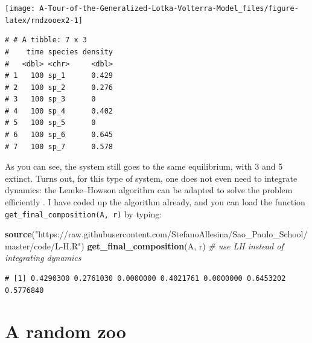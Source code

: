 \documentclass[]{book}
\newenvironment{Shaded}{\begin{snugshade}}{\end{snugshade}}
\newcommand{\CommentTok}[1]{\textcolor[rgb]{0.56,0.35,0.01}{\textit{#1}}}
\newcommand{\DataTypeTok}[1]{\textcolor[rgb]{0.13,0.29,0.53}{#1}}
\newcommand{\DecValTok}[1]{\textcolor[rgb]{0.00,0.00,0.81}{#1}}
\newcommand{\KeywordTok}[1]{\textcolor[rgb]{0.13,0.29,0.53}{\textbf{#1}}}
\newcommand{\NormalTok}[1]{#1}
\newcommand{\OperatorTok}[1]{\textcolor[rgb]{0.81,0.36,0.00}{\textbf{#1}}}
\newcommand{\StringTok}[1]{\textcolor[rgb]{0.31,0.60,0.02}{#1}}
\begin{document}
\begin{center}\texttt{[image: A-Tour-of-the-Generalized-Lotka-Volterra-Model\_files/figure-latex/rndzooex2-1]} \end{center}

\begin{Shaded}
\end{Shaded}

\begin{verbatim}
# # A tibble: 7 x 3
#    time species density
#   <dbl> <chr>     <dbl>
# 1   100 sp_1      0.429
# 2   100 sp_2      0.276
# 3   100 sp_3      0    
# 4   100 sp_4      0.402
# 5   100 sp_5      0    
# 6   100 sp_6      0.645
# 7   100 sp_7      0.578
\end{verbatim}

As you can see, the system still goes to the same equilibrium, with 3 and 5 extinct. Turns out, for this type of system, one does not even need to integrate dynamics: the Lemke--Howson algorithm can be adapted to solve the problem efficiently \citep{servan2018coexistence}. I have coded up the algorithm already, and you can load the function \texttt{get\_final\_composition(A,\ r)} by typing:

\begin{Shaded}
\begin{Highlighting}[]
\KeywordTok{source}\NormalTok{(}\StringTok{"https://raw.githubusercontent.com/StefanoAllesina/Sao_Paulo_School/master/code/L-H.R"}\NormalTok{)}
\KeywordTok{get_final_composition}\NormalTok{(A, r) }\CommentTok{# use LH instead of integrating dynamics}
\end{Highlighting}
\end{Shaded}

\begin{verbatim}
# [1] 0.4290300 0.2761030 0.0000000 0.4021761 0.0000000 0.6453202 0.5776840
\end{verbatim}

\hypertarget{a-random-zoo}{%
\section{A random zoo}\label{a-random-zoo}}
\end{document}
